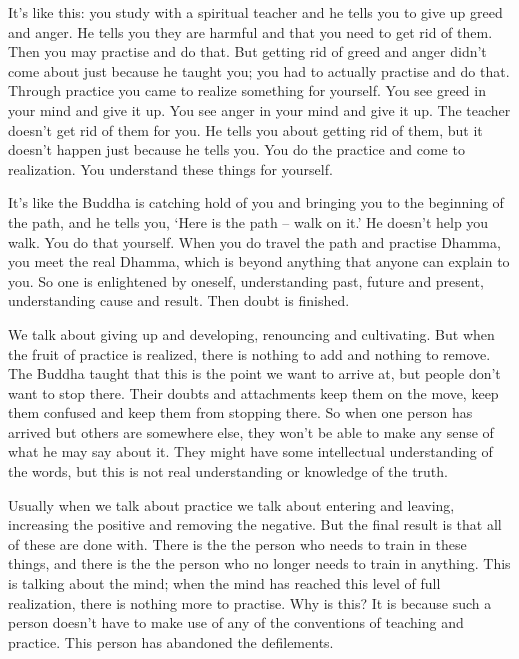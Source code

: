 It's like this: you study with a spiritual teacher and he tells you to give up greed and anger. He tells you they are harmful and that you need to get rid of them. Then you may practise and do that. But getting rid of greed and anger didn't come about just because he taught you; you had to actually practise and do that. Through practice you came to realize something for yourself. You see greed in your mind and give it up. You see anger in your mind and give it up. The teacher doesn't get rid of them for you. He tells you about getting rid of them, but it doesn't happen just because he tells you. You do the practice and come to realization. You understand these things for yourself.

It's like the Buddha is catching hold of you and bringing you to the beginning of the path, and he tells you, `Here is the path -- walk on it.' He doesn't help you walk. You do that yourself. When you do travel the path and practise Dhamma, you meet the real Dhamma, which is beyond anything that anyone can explain to you. So one is enlightened by oneself, understanding past, future and present, understanding cause and result. Then doubt is finished.

We talk about giving up and developing, renouncing and cultivating. But when the fruit of practice is realized, there is nothing to add and nothing to remove. The Buddha taught that this is the point we want to arrive at, but people don't want to stop there. Their doubts and attachments keep them on the move, keep them confused and keep them from stopping there. So when one person has arrived but others are somewhere else, they won't be able to make any sense of what he may say about it. They might have some intellectual understanding of the words, but this is not real understanding or knowledge of the truth.

Usually when we talk about practice we talk about entering and leaving, increasing the positive and removing the negative. But the final result is that all of these are done with. There is the  the person who needs to train in these things, and there is the  the person who no longer needs to train in anything. This is talking about the mind; when the mind has reached this level of full realization, there is nothing more to practise. Why is this? It is because such a person doesn't have to make use of any of the conventions of teaching and practice. This person has abandoned the defilements.

